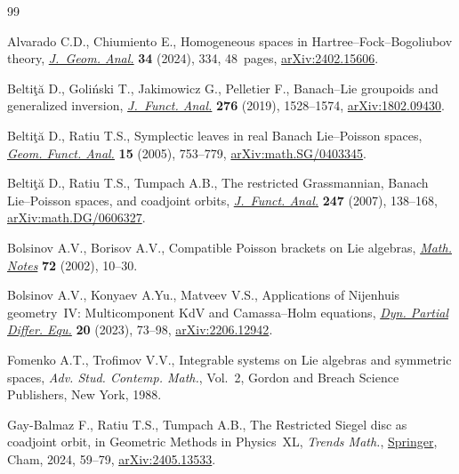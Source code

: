 \begin{thebibliography}{99}
\footnotesize\itemsep=0pt

Alvarado C.D., Chiumiento E., Homogeneous spaces in
 {H}artree--{F}ock--{B}ogoliubov theory, \href{https://doi.org/10.1007/s12220-024-01776-6}{\textit{J.~Geom. Anal.}} \textbf{34}
 (2024), 334, 48~pages, \href{https://arxiv.org/abs/2402.15606}{arXiv:2402.15606}.

Belti\c{t}\u{a} D., Goli\'nski T., Jakimowicz G., Pelletier F., Banach--{L}ie
 groupoids and generalized inversion, \href{https://doi.org/10.1016/j.jfa.2018.12.002}{\textit{J.~Funct. Anal.}} \textbf{276}
 (2019), 1528--1574, \href{https://arxiv.org/abs/1802.09430}{arXiv:1802.09430}.

Belti\c{t}\u{a} D., Ratiu T.S., Symplectic leaves in real {B}anach
 {L}ie--{P}oisson spaces, \href{https://doi.org/10.1007/s00039-005-0524-9}{\textit{Geom. Funct. Anal.}} \textbf{15} (2005),
 753--779, \href{https://arxiv.org/abs/math.SG/0403345}{arXiv:math.SG/0403345}.

Belti\c{t}\u{a} D., Ratiu T.S., Tumpach A.B., The restricted {G}rassmannian,
 {B}anach {L}ie--{P}oisson spaces, and coadjoint orbits, \href{https://doi.org/10.1016/j.jfa.2007.03.001}{\textit{J.~Funct.
 Anal.}} \textbf{247} (2007), 138--168, \href{https://arxiv.org/abs/math.DG/0606327}{arXiv:math.DG/0606327}.

Bolsinov A.V., Borisov A.V., Compatible {P}oisson brackets on {L}ie algebras,
 \href{https://doi.org/10.1023/A:1019856702638}{\textit{Math. Notes}} \textbf{72} (2002), 10--30.

Bolsinov A.V., Konyaev A.Yu., Matveev V.S., Applications of {N}ijenhuis
 geometry~{IV}: {M}ulticomponent {K}d{V} and {C}amassa--{H}olm equations,
 \href{https://doi.org/10.4310/dpde.2023.v20.n1.a4}{\textit{Dyn. Partial Differ. Equ.}} \textbf{20} (2023), 73--98,
 \href{https://arxiv.org/abs/2206.12942}{arXiv:2206.12942}.

Fomenko A.T., Trofimov V.V., Integrable systems on {L}ie algebras and symmetric
 spaces, \textit{Adv. Stud. Contemp. Math.}, Vol.~2, Gordon and Breach Science
 Publishers, New York, 1988.

Gay-Balmaz F., Ratiu T.S., Tumpach A.B., The {R}estricted {S}iegel disc as
 coadjoint orbit, in Geometric {M}ethods in {P}hysics~{XL}, \textit{Trends Math.},
 \href{https://doi.org/10.1007/978-3-031-62407-0_6}{Springer}, Cham, 2024, 59--79, \href{https://arxiv.org/abs/2405.13533}{arXiv:2405.13533}.


\end{thebibliography}
